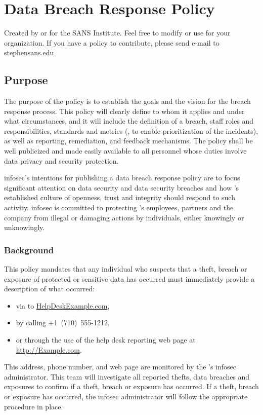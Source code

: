 \chapter{Data Breach Response Policy}
\setcounter{section}{0}
Created by or for the SANS Institute.  
Feel free to modify or use for your organization.  
If you have a policy to contribute, please send e-mail to \href{mailto:stephen@sans.edu}{stephen\at{}sans.edu}
\section{Purpose}
The purpose of the policy is to establish the goals and the vision for the breach response process.  
This policy will clearly define to whom it applies and under what circumstances, and it will include the definition of a breach, staff roles and responsibilities, standards and metrics (\eg, to enable prioritization of the incidents), as well as reporting, remediation, and feedback mechanisms.  
The policy shall be well publicized and made easily available to all personnel whose duties involve data privacy and security protection.

\OrganizationName{} \gls{infosec}'s intentions for publishing a data breach response policy are to focus significant attention on data security and data security breaches and how \OrganizationName{}'s established culture of openness, trust\oxford{} and integrity should respond to such activity.  
\OrganizationName{} \gls{infosec} is committed to protecting \OrganizationName{}'s employees, partners and the company from illegal or damaging actions by individuals, either knowingly or unknowingly. 

\subsection{Background}
This policy mandates that any individual who suspects that a theft, breach\oxford{} or exposure of \OrganizationName{} protected or\del{ \OrganizationName{}} sensitive data has occurred must immediately provide a description of what occurred:
\begin{itemize}
\item
via \email{} to \href{maito:helpdesk@example.com}{HelpDesk\at{}Example.com},%
\item
by calling +1~(710)~555-1212,%
\item
or through the use of the help desk reporting web page at \href{http://example.com}{http://Example.com}.%
\end{itemize}
This \email{} address, phone number, and web page are monitored by the \OrganizationName{}'s \gls{infosec} administrator.  
This team will investigate all reported thefts, data breaches\oxford{} and exposures to confirm if a theft, breach\oxford{} or exposure has occurred.  
If a theft, breach\oxford{} or exposure has occurred, the \gls{infosec} administrator will follow the appropriate procedure in place.

